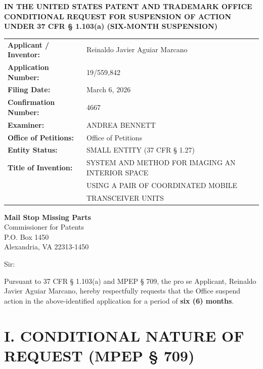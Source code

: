 \documentclass[11pt,letterpaper]{article}
\begin{document}
\thispagestyle{empty}

\begin{center}
    \textbf{\large IN THE UNITED STATES PATENT AND TRADEMARK OFFICE} \\
    \vspace{0.3cm}
    \textbf{\large CONDITIONAL REQUEST FOR SUSPENSION OF ACTION} \\
    \textbf{\normalsize UNDER 37 CFR \S{} 1.103(a) (SIX-MONTH SUSPENSION)}
\end{center}

\vspace{0.4cm}
\noindent\begin{tabular}{p{2.3in}p{4.0in}}
\textbf{Applicant / Inventor:} & Reinaldo Javier Aguiar Marcano \\
\textbf{Application Number:} & 19/559,842 \\
\textbf{Filing Date:} & March 6, 2026 \\
\textbf{Confirmation Number:} & 4667 \\
\textbf{Examiner:} & ANDREA BENNETT \\
\textbf{Office of Petitions:} & Office of Petitions \\
\textbf{Entity Status:} & SMALL ENTITY (37 CFR \S{} 1.27) \\
\textbf{Title of Invention:} & SYSTEM AND METHOD FOR IMAGING AN INTERIOR SPACE \\
& USING A PAIR OF COORDINATED MOBILE \\
& TRANSCEIVER UNITS \\
\end{tabular}

\vspace{0.5cm}
\noindent\textbf{Mail Stop Missing Parts} \\
Commissioner for Patents \\
P.O. Box 1450 \\
Alexandria, VA 22313-1450

\vspace{0.2cm}
Sir:

Pursuant to 37 CFR \S{} 1.103(a) and MPEP \S{} 709, the pro se Applicant, Reinaldo Javier Aguiar Marcano, hereby respectfully requests that the Office suspend action in the above-identified application for a period of \textbf{six (6) months}.

\section*{I. CONDITIONAL NATURE OF REQUEST (MPEP \S{} 709)}
\end{document}
